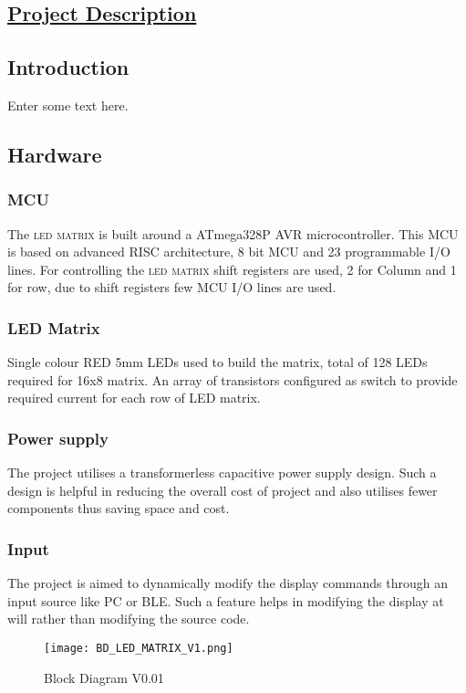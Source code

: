 \vspace*{8.5cm}

\begin{flushright}
	\section{\huge{\underline{Project Description}}}
\end{flushright}

		\subsection{Introduction}
			Enter some text here.
			
		\subsection{Hardware}
			\subsubsection{MCU}
				The \textsc{led matrix} is built around a ATmega328P AVR microcontroller. This MCU is based on advanced RISC architecture, 8 bit MCU and 23 programmable I/O lines. For controlling the \textsc{led matrix} shift registers are used, 2 for Column and 1 for row, due to shift registers few MCU I/O lines are used.
			\subsubsection{LED Matrix}
				 Single colour  RED 5mm LEDs used to build the matrix, total of 128 LEDs required for 16x8 matrix. An array of transistors configured as switch to provide required current for each row of LED matrix.  
				
			\subsubsection{Power supply}
				The project utilises a transformerless capacitive power supply design. Such a design is helpful in reducing the overall cost of project and also utilises fewer components thus saving space and cost.
			\subsubsection{Input}
				 The project is aimed to dynamically modify the display commands through an input source like PC or BLE. Such a feature helps in modifying the display at will rather than modifying the source code.
				 
			\begin{figure}[H]
					\texttt{[image: BD\_LED\_MATRIX\_V1.png]}
					\caption{Block Diagram V0.01}
					\label{fig:image1}
			\end{figure}
				  



